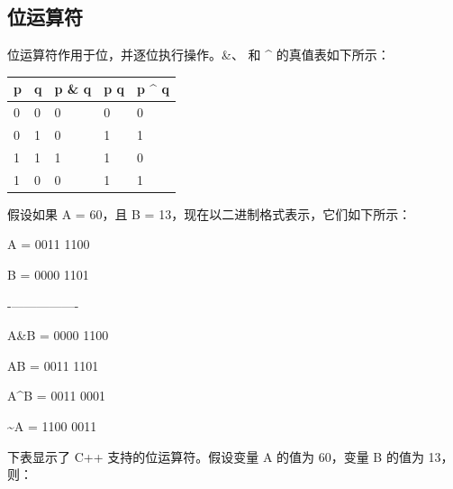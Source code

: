 \documentclass[
]{article}
\begin{document}
\hypertarget{ux4f4dux8fd0ux7b97ux7b26}{%
\subsection{位运算符}\label{ux4f4dux8fd0ux7b97ux7b26}}

位运算符作用于位，并逐位执行操作。\&、 \textbar{} 和 \^{}
的真值表如下所示：

\begin{longtable}[]{@{}lllll@{}}
\toprule
p & q & p \& q & p \textbar{} q & p \^{} q \\
\midrule
\endhead
0 & 0 & 0 & 0 & 0 \\
0 & 1 & 0 & 1 & 1 \\
1 & 1 & 1 & 1 & 0 \\
1 & 0 & 0 & 1 & 1 \\
\bottomrule
\end{longtable}

假设如果 A = 60，且 B = 13，现在以二进制格式表示，它们如下所示：

A = 0011 1100

B = 0000 1101

-\/----------------

A\&B = 0000 1100

A\textbar B = 0011 1101

A\^{}B = 0011 0001

\textasciitilde A = 1100 0011

下表显示了 C++ 支持的位运算符。假设变量 A 的值为 60，变量 B 的值为
13，则：
\end{document}
